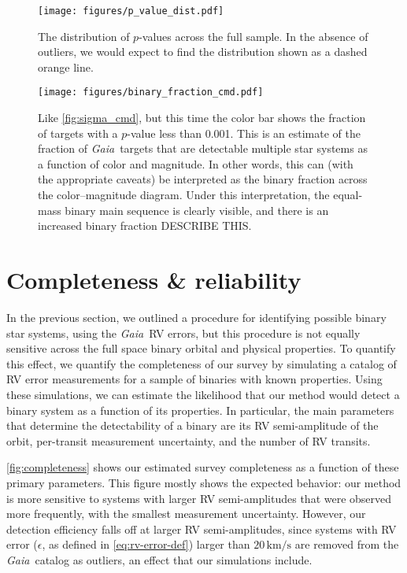 \documentclass[modern, letterpaper]{aastex631}
\newcommand{\project}[1]{\textsl{#1}}
\newcommand{\Gaia}{\project{Gaia}}
\begin{document}
\begin{figure}
	\begin{centering}
		\texttt{[image: figures/p\_value\_dist.pdf]}
		\caption{The distribution of $p$-values across the full sample. In the absence of outliers, we would expect to find the distribution shown as a dashed orange line.}
		\label{fig:p_value_dist}
	\end{centering}
\end{figure}

\begin{figure}
	\begin{centering}
		\texttt{[image: figures/binary\_fraction\_cmd.pdf]}
		\caption{Like \autoref{fig:sigma_cmd}, but this time the color bar shows the fraction of targets with a $p$-value less than 0.001. This is an estimate of the fraction of \Gaia\ targets that are detectable multiple star systems as a function of color and magnitude. In other words, this can (with the appropriate caveats) be interpreted as the binary fraction across the color--magnitude diagram. Under this interpretation, the equal-mass binary main sequence is clearly visible, and there is an increased binary fraction DESCRIBE THIS.}
		\label{fig:binary_fraction_cmd}
	\end{centering}
\end{figure}


\newpage

\section{Completeness \& reliability}

In the previous section, we outlined a procedure for identifying possible binary star systems, using the \Gaia\ RV errors, but this procedure is not equally sensitive across the full space binary orbital and physical properties.
To quantify this effect, we quantify the completeness of our survey by simulating a catalog of RV error measurements for a sample of binaries with known properties.
Using these simulations, we can estimate the likelihood that our method would detect a binary system as a function of its properties.
In particular, the main parameters that determine the detectability of a binary are its RV semi-amplitude of the orbit, per-transit measurement uncertainty, and the number of RV transits.

\autoref{fig:completeness} shows our estimated survey completeness as a function of these primary parameters.
This figure mostly shows the expected behavior: our method is more sensitive to systems with larger RV semi-amplitudes that were observed more frequently, with the smallest measurement uncertainty.
However, our detection efficiency falls off at larger RV semi-amplitudes, since systems with RV error ($\epsilon$, as defined in \autoref{eq:rv-error-def}) larger than $20\,\mathrm{km/s}$ are removed from the \Gaia\ catalog as outliers, an effect that our simulations include.
\end{document}
